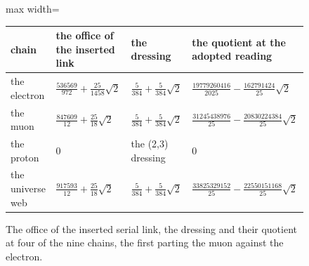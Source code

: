 \begin{figure}[h]\centering
\begin{adjustbox}{max width=\linewidth}\begin{tabular}{llll}\toprule
chain & the office of the inserted link & the dressing & the quotient at the adopted reading \\ \midrule
the electron & $\tfrac{536569}{972} + \tfrac{25}{1458}\sqrt{2}$ & $\tfrac{5}{384} + \tfrac{5}{384}\sqrt{2}$ & $\tfrac{19779260416}{2025} - \tfrac{162791424}{25}\sqrt{2}$ \\
the muon & $\tfrac{847609}{12} + \tfrac{25}{18}\sqrt{2}$ & $\tfrac{5}{384} + \tfrac{5}{384}\sqrt{2}$ & $\tfrac{31245438976}{25} - \tfrac{20830224384}{25}\sqrt{2}$ \\
the proton & $0$ & the (2,3) dressing & $0$ \\
the universe web & $\tfrac{917593}{12} + \tfrac{25}{18}\sqrt{2}$ & $\tfrac{5}{384} + \tfrac{5}{384}\sqrt{2}$ & $\tfrac{33825329152}{25} - \tfrac{22550151168}{25}\sqrt{2}$ \\ \bottomrule
\end{tabular}\end{adjustbox}
\caption{The office of the inserted serial link, the dressing and their quotient at four of the nine chains, the first parting the muon against the electron.}
\end{figure}
\par\medskip{}\label{narr:close:3-1}\par
